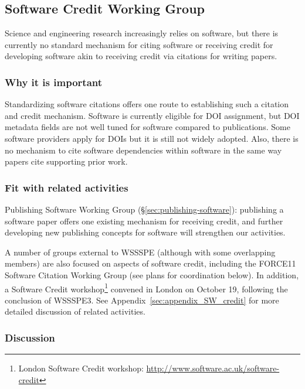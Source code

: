 \subsection{Software Credit Working Group}
\label{sec:software-credit}

Science and engineering research increasingly relies on software, but there is currently no standard mechanism for citing software or receiving credit for developing software akin to receiving credit via citations for writing papers.


\subsubsection{Why it is important}

Standardizing software citations offers one route to establishing such a citation and credit mechanism.
Software is currently eligible for DOI assignment, but DOI metadata fields are not well tuned for software compared to publications. 
Some software providers apply for DOIs but it is still not widely adopted. 
Also, there is no mechanism to cite software dependencies within software in the same way papers cite supporting prior work.

\subsubsection{Fit with related activities}

Publishing Software Working Group (\S\ref{sec:publishing-software}): publishing a software paper offers one existing mechanism for receiving credit, and further developing new publishing concepts for software will strengthen our activities.

A number of groups external to WSSSPE (although with some overlapping members) are also focused on aspects of software credit, including the FORCE11 Software Citation Working Group (see plans for coordination below).
In addition, a Software Credit workshop\footnote{London Software Credit workshop: \url{http://www.software.ac.uk/software-credit}} convened in London on October 19, following the conclusion of WSSSPE3.
See Appendix~\ref{sec:appendix_SW_credit} for more detailed discussion of related activities.

\subsubsection{Discussion}

